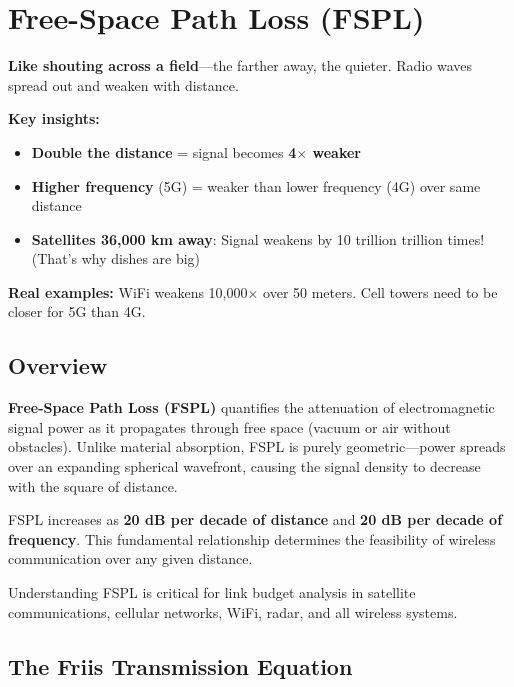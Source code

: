 \chapter{Free-Space Path Loss (FSPL)}
\label{ch:fspl}

\begin{nontechnical}
\textbf{Like shouting across a field}---the farther away, the quieter. Radio waves spread out and weaken with distance.

\textbf{Key insights:}
\begin{itemize}
\item \textbf{Double the distance} = signal becomes \textbf{4$\times$ weaker}
\item \textbf{Higher frequency} (5G) = weaker than lower frequency (4G) over same distance
\item \textbf{Satellites 36,000 km away}: Signal weakens by 10 trillion trillion times! (That's why dishes are big)
\end{itemize}

\textbf{Real examples:} WiFi weakens 10,000$\times$ over 50 meters. Cell towers need to be closer for 5G than 4G.
\end{nontechnical}

\section{Overview}

\textbf{Free-Space Path Loss (FSPL)} quantifies the attenuation of electromagnetic signal power as it propagates through free space (vacuum or air without obstacles). Unlike material absorption, FSPL is purely geometric---power spreads over an expanding spherical wavefront, causing the signal density to decrease with the square of distance.

\begin{keyconcept}
FSPL increases as \textbf{20 dB per decade of distance} and \textbf{20 dB per decade of frequency}. This fundamental relationship determines the feasibility of wireless communication over any given distance.
\end{keyconcept}

Understanding FSPL is critical for link budget analysis in satellite communications, cellular networks, WiFi, radar, and all wireless systems.

\section{The Friis Transmission Equation}
\label{sec:friis-equation}

